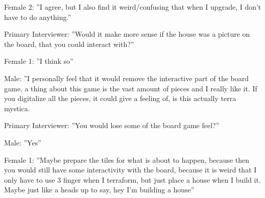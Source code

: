 Female 2: ”I agree, but I also find it weird/confusing that when I upgrade, I don’t have to do anything.”

Primary Interviewer: ”Would it make more sense if the house was a picture on the board, that you could interact with?”

Female 1: ”I think so”

Male: ”I personally feel that it would remove the interactive part of the board game, a thing about this game is the vast amount of pieces and I really like it. If you digitalize all the pieces, it could give a feeling of, is this actually terra mystica.

Primary Interviewer: ”You would lose some of the board game feel?”

Male: ”Yes”

Female 1: ”Maybe prepare the tiles for what is about to happen, because then you would still have some interactivity with the board, because it is weird that I only have to use 3 finger when I terraform, but just place a house when I build it. Maybe just like a heads up to say, hey I’m building a house”





